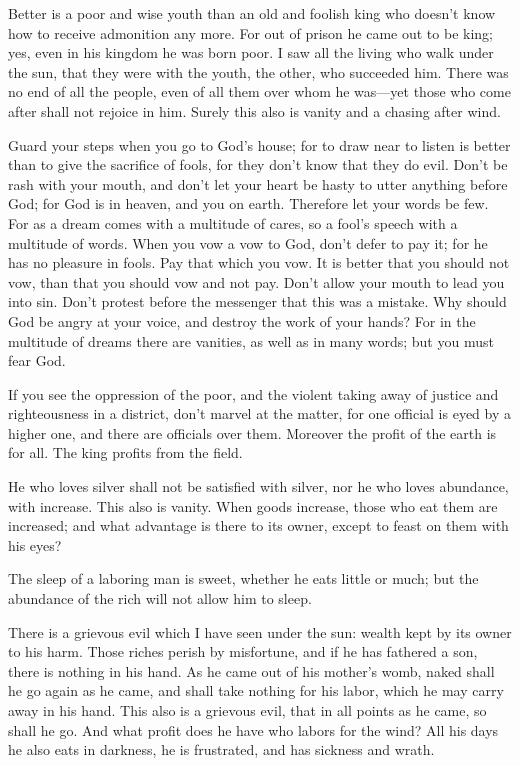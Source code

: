 \myverse{}Better is a poor and wise youth than an old and foolish king
who doesn’t know how to receive admonition any more.
\myverse{}For out of prison he came out to be king; yes, even in his kingdom he was
born poor.
\myverse{}I saw all the living who walk under the sun, that they were with the youth,
the other, who succeeded him.
\myverse{}There was no end of all the people, even of all them over whom he was—yet
those who come after shall not rejoice in him. Surely this also is vanity and a chasing after wind.



\mychapter{} \myverse*{}Guard your steps when you go to God’s house; for to draw near to
listen is better than to give the sacrifice of fools, for they don’t know that they do evil.
\myverse{}Don’t be rash with your mouth, and don’t let your heart be hasty to utter anything
before God; for God is in heaven, and you on earth. Therefore let your words be few.
\myverse{}For as a dream comes with a multitude of cares, so a fool’s speech with a multitude
of words.
\myverse{}When you vow a vow to God, don’t defer to pay it; for he has no pleasure in
fools. Pay that which you vow.
\myverse{}It is better that you should not vow, than that you should vow and not pay.
\myverse{}Don’t allow your mouth to lead you into sin. Don’t protest before the messenger
that this was a mistake. Why should God be angry at your voice, and destroy the work of your hands?
\myverse{}For in the multitude of dreams there are vanities, as well as in many words;
but you must fear God.

\myverse{}If you see the oppression of the poor, and the violent taking away
of justice and righteousness in a district, don’t marvel at the matter, for one official is eyed by a
higher one, and there are officials over them.
\myverse{}Moreover the profit of the earth is for all. The king profits from the field.

\myverse{}He who loves silver shall not be satisfied with silver, nor he
who loves abundance, with increase. This also is vanity.
\myverse{}When goods increase, those who eat them are increased; and what advantage
is there to its owner, except to feast on them with his eyes?

\myverse{}The sleep of a laboring man is sweet, whether he eats little
or much; but the abundance of the rich will not allow him to sleep.

\myverse{}There is a grievous evil which I have seen under the sun: wealth
kept by its owner to his harm.
\myverse{}Those riches perish by misfortune, and if he has fathered a son, there is
nothing in his hand.
\myverse{}As he came out of his mother’s womb, naked shall he go again as he came, and
shall take nothing for his labor, which he may carry away in his hand.
\myverse{}This also is a grievous evil, that in all points as he came, so shall he go.
And what profit does he have who labors for the wind?
\myverse{}All his days he also eats in darkness, he is frustrated, and has sickness
and wrath.

